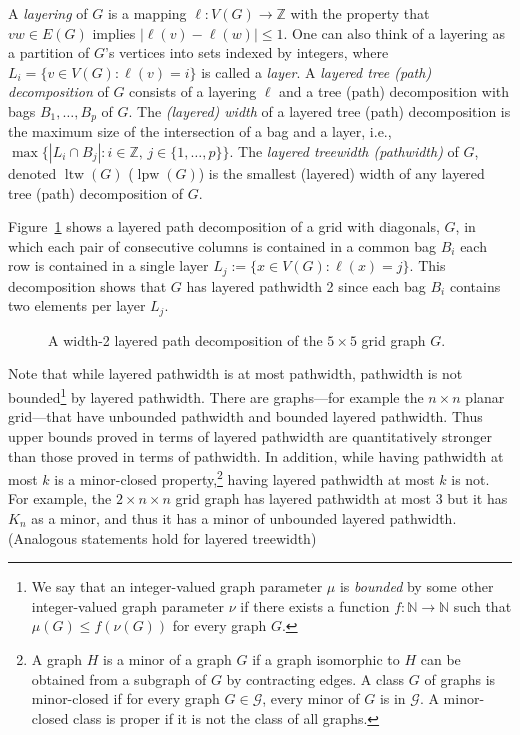 \documentclass{jgaa-art}
\newcommand{\etal}{et al.}
\newcommand{\Z}{\mathbb{Z}}
\newcommand{\N}{\mathbb{N}}
\newcommand{\figlabel}[1]{\label{fig:#1}}
\newcommand{\figref}[1]{\mbox{Figure~\ref{fig:#1}}}
\DeclareMathOperator{\lpw}{lpw}
\DeclareMathOperator{\ltw}{ltw}
\begin{document}
   A \emph{layering} of $G$ is a mapping $\ell:V(G)\to\Z$ with the
property that $vw\in E(G)$ implies $|\ell(v)-\ell(w)|\le 1$. One
can also think of a layering as a partition of $G$'s vertices into
sets indexed by integers, where $L_i=\{v\in V(G)
: \ell(v)=i\}$ is called a  \emph{layer}.  A \emph{layered tree (path) decomposition} of $G$ consists
of a layering $\ell$ and a tree (path) decomposition with bags $B_1,\ldots,B_p$ of $G$.
The \emph{(layered) width} of a layered tree (path) decomposition is the maximum
size of the intersection of a bag and a layer, i.e., $\max\{|L_i\cap
B_j|:i\in\Z,\, j\in\{1,\ldots,p\}\}$.  The \emph{layered treewidth (pathwidth)} of
$G$, denoted $\ltw(G)$ ($\lpw(G)$) is the smallest (layered) width of any layered
tree (path) decomposition of $G$.

\figref{grid} shows a layered path decomposition of a grid with diagonals, $G$, in which each pair of consecutive columns is contained in a common bag $B_i$ each row is contained in a single layer $L_j:=\{x\in V(G):\ell(x)=j\}$.  This decomposition shows that $G$ has layered pathwidth 2 since each bag $B_i$ contains two elements per layer $L_j$.
\begin{figure}
    \caption{A width-2 layered path decomposition of the $5\times 5$ grid graph $G$.}
    \figlabel{grid}
\end{figure}


Note that while layered pathwidth is at most pathwidth, pathwidth is
not bounded\footnote{We say that an integer-valued graph parameter $\mu$ is \emph{bounded} by some other integer-valued graph parameter $\nu$ if there exists a function $f:\N\to\N$ such that $\mu(G)\le f(\nu(G))$ for every graph $G$.} by layered pathwidth. There are graphs---for example the $n \times
n$ planar grid---that have unbounded pathwidth and bounded layered
pathwidth. Thus upper bounds proved in terms of layered pathwidth are
quantitatively stronger than those proved in terms of pathwidth. In addition, while having pathwidth at most $k$ is a minor-closed property,\footnote{A graph $H$ is a minor of a graph $G$ if a graph isomorphic to $H$ can be obtained from a
subgraph of $G$ by contracting edges. A class $G$ of graphs is minor-closed if for every graph $G\in\mathcal{G}$, every minor of $G$
is in $\mathcal{G}$. A minor-closed class is proper if it is not the class of all graphs.} having layered pathwidth at most $k$ is not.  For
example, the $2 \times n \times n$ grid graph has layered pathwidth at most $3$ but
it has  $K_n$ as a minor, and thus it has a minor of unbounded layered pathwidth. (Analogous statements hold for layered treewidth)
\end{document}
